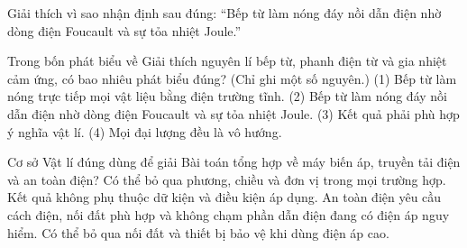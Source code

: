 \begin{bt}
Giải thích vì sao nhận định sau đúng: “Bếp từ làm nóng đáy nồi dẫn điện nhờ dòng điện Foucault và sự tỏa nhiệt Joule.”
\end{bt}

\begin{ex}
Trong bốn phát biểu về Giải thích nguyên lí bếp từ, phanh điện từ và gia nhiệt cảm ứng, có bao nhiêu phát biểu đúng? (Chỉ ghi một số nguyên.) (1) Bếp từ làm nóng trực tiếp mọi vật liệu bằng điện trường tĩnh. (2) Bếp từ làm nóng đáy nồi dẫn điện nhờ dòng điện Foucault và sự tỏa nhiệt Joule. (3) Kết quả phải phù hợp ý nghĩa vật lí. (4) Mọi đại lượng đều là vô hướng.
\end{ex}

\begin{ex}
Cơ sở Vật lí đúng dùng để giải Bài toán tổng hợp về máy biến áp, truyền tải điện và an toàn điện?
\choice
{Có thể bỏ qua phương, chiều và đơn vị trong mọi trường hợp.}
{Kết quả không phụ thuộc dữ kiện và điều kiện áp dụng.}
{\True An toàn điện yêu cầu cách điện, nối đất phù hợp và không chạm phần dẫn điện đang có điện áp nguy hiểm.}
{Có thể bỏ qua nối đất và thiết bị bảo vệ khi dùng điện áp cao.}
\end{ex}


